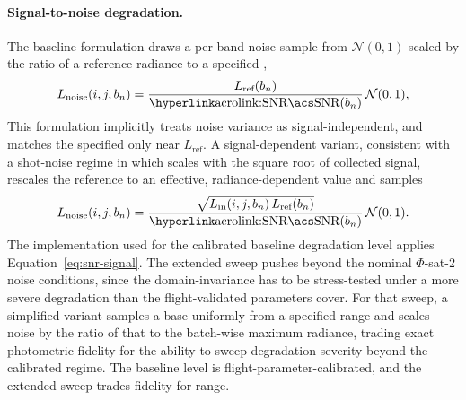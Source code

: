 \paragraph{Signal-to-noise degradation.} The baseline formulation draws a per-band noise sample from $\mathcal{N}(0,1)$ scaled by the ratio of a reference radiance to a specified ,
\begin{equation}
    L_{\text{noise}}(i,j,b_n) = \frac{L_{\text{ref}}(b_n)}{\text{\acref{SNR}}(b_n)}\,\mathcal{N}(0,1), \label{eq:snr-const} \end{equation} This formulation implicitly treats noise variance as signal-independent, and matches the specified  only near $L_{\text{ref}}$.
A signal-dependent variant, consistent with a shot-noise regime in which  scales with the square root of collected signal, rescales the reference  to an effective, radiance-dependent value and samples
\begin{equation}
    L_{\text{noise}}(i,j,b_n) = \frac{\sqrt{L_{\text{in}}(i,j,b_n)\,L_{\text{ref}}(b_n)}}{\text{\acref{SNR}}(b_n)}\,\mathcal{N}(0,1).
    \label{eq:snr-signal}
\end{equation}
The implementation used for the calibrated baseline degradation level applies Equation~\eqref{eq:snr-signal}.
The extended sweep pushes beyond the nominal $\Phi$-sat-2 noise conditions, since the domain-invariance has to be stress-tested under a more severe degradation than the flight-validated parameters cover.
For that sweep, a simplified variant samples a base  uniformly from a specified range and scales noise by the ratio of that  to the batch-wise maximum radiance, trading exact photometric fidelity for the ability to sweep degradation severity beyond the calibrated regime.
The baseline level is flight-parameter-calibrated, and the extended sweep trades fidelity for range.

